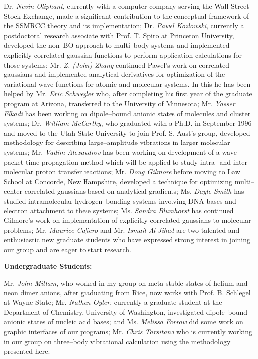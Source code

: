 \noindent
Dr. {\em Nevin Oliphant}, currently 
with a computer company serving the Wall Street Stock Exchange,
made a significant contribution to the conceptual 
framework of the SSMRCC theory and its implementation;
Dr. {\em Pawel Kozlowski}, currently a postdoctoral research 
associate  
with Prof. T. Spiro at
Princeton University, developed the non--BO approach 
to multi--body systems and implemented explicitly
correlated gaussian functions to perform application 
calculations for those systems; 
Mr. {\em Z. (John) Zhang}
continued Pawel's work on correlated gaussians and 
implemented analytical derivatives for optimization of the
variational wave functions for atomic and molecular 
systems.  In this he has been helped by 
Mr. {\em Eric Schwegler} 
who, after completing his first year of the graduate program 
at Arizona, transferred to the University of
Minnesota; 
Mr. {\em Yasser Elkadi}
has been working on 
dipole--bound anionic states of molecules and cluster
systems; 
Dr. {\em William McCarthy}, 
who graduated 
with a Ph.D. in September 1996 and moved to the Utah
State University to join Prof. S. Aust's group,  
developed methodology for describing
large--amplitude vibrations in larger molecular systems; 
Mr. {\em Vadim Alexandrov} has been working on
development of a wave-packet time-propagation method which will
be applied to study intra- and inter-molecular proton transfer
reactions; 
Mr. {\em Doug Gilmore} before moving to Law School at Concorde,
New Hampshire,
developed a technique for
optimizing multi--center correlated gaussians
based on analytical gradients; 
Ms. {\em Dayle Smith} 
has studied 
intramolecular hydrogen--bonding
systems involving DNA bases and electron attachment to these
systems;   
Ms. {\em Sandra Blumhorst} 
has continued Gilmore's work on implementation
of explicitly correlated gaussians to molecular problems;
Mr. {\em Maurice Cafiero} and Mr. {\em Ismail Al-Jihad} are two talented and 
enthusiastic new graduate students who have expressed
strong interest in joining our group and 
are eager to start research.

\vspace{2mm}
\noindent
{\bf Undergraduate Students:}

\noindent
Mr. {\em John Millam}, 
who worked in my group on meta-stable
states of helium and neon dimer anions,
after graduating from 
Rice, now works with Prof. B. Schlegel at 
Wayne State;
Mr. {\em Nathan Oyler}, 
currently a graduate student at the Department of
Chemistry, University of Washington, investigated 
dipole--bound anionic states of nucleic acid bases; and 
Ms. {\em Melissa Farrow} 
did some work on graphic interfaces of our programs;
Mr. {\em Chris Tarsitano} who is currently working in our group 
on three--body vibrational calculation using the methodology
presented here.


